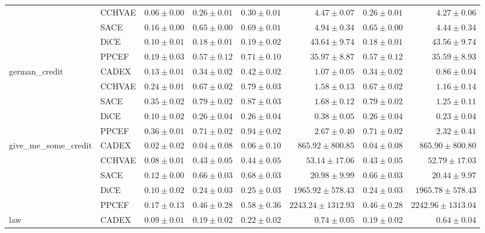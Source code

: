 \begin{table}[ht]
\begin{center}
\begin{sc}
\begin{scriptsize}
\begin{tabular}{l|l|rrrrrr}
 & CCHVAE & $\boldsymbol{0.06\pm{0.00}}$ & $0.26\pm{0.01}$ & $0.30\pm{0.01}$ & $\boldsymbol{4.47\pm{0.07}}$ & $0.26\pm{0.01}$ & $\boldsymbol{4.27\pm{0.06}}$ \\
 & SACE & $0.16\pm{0.00}$ & $0.65\pm{0.00}$ & $0.69\pm{0.01}$ & $4.94\pm{0.34}$ & $0.65\pm{0.00}$ & $4.44\pm{0.34}$ \\
 & DiCE & $0.10\pm{0.01}$ & $0.18\pm{0.01}$ & $\boldsymbol{0.19\pm{0.02}}$ & $43.64\pm{9.74}$ & $0.18\pm{0.01}$ & $43.56\pm{9.74}$ \\
 & PPCEF & $0.19\pm{0.03}$ & $0.57\pm{0.12}$ & $0.71\pm{0.10}$ & $35.97\pm{8.87}$ & $0.57\pm{0.12}$ & $35.59\pm{8.93}$ \\
\midrule
\multirow{5}{*}{german\_credit} & CADEX & $0.13\pm{0.01}$ & $0.34\pm{0.02}$ & $0.42\pm{0.02}$ & $1.07\pm{0.05}$ & $0.34\pm{0.02}$ & $0.86\pm{0.04}$ \\
 & CCHVAE & $0.24\pm{0.01}$ & $0.67\pm{0.02}$ & $0.79\pm{0.03}$ & $1.58\pm{0.13}$ & $0.67\pm{0.02}$ & $1.16\pm{0.14}$ \\
 & SACE & $0.35\pm{0.02}$ & $0.79\pm{0.02}$ & $0.87\pm{0.03}$ & $1.68\pm{0.12}$ & $0.79\pm{0.02}$ & $1.25\pm{0.11}$ \\
 & DiCE & $\boldsymbol{0.10\pm{0.02}}$ & $\boldsymbol{0.26\pm{0.04}}$ & $\boldsymbol{0.26\pm{0.04}}$ & $\boldsymbol{0.38\pm{0.05}}$ & $\boldsymbol{0.26\pm{0.04}}$ & $\boldsymbol{0.23\pm{0.04}}$ \\
 & PPCEF & $0.36\pm{0.01}$ & $0.71\pm{0.02}$ & $0.94\pm{0.02}$ & $2.67\pm{0.40}$ & $0.71\pm{0.02}$ & $2.32\pm{0.41}$ \\
\midrule
\multirow{5}{*}{give\_me\_some\_credit} & CADEX & $\boldsymbol{0.02\pm{0.02}}$ & $\boldsymbol{0.04\pm{0.08}}$ & $\boldsymbol{0.06\pm{0.10}}$ & $865.92\pm{800.85}$ & $\boldsymbol{0.04\pm{0.08}}$ & $865.90\pm{800.80}$ \\
 & CCHVAE & $0.08\pm{0.01}$ & $0.43\pm{0.05}$ & $0.44\pm{0.05}$ & $53.14\pm{17.06}$ & $0.43\pm{0.05}$ & $52.79\pm{17.03}$ \\
 & SACE & $0.12\pm{0.00}$ & $0.66\pm{0.03}$ & $0.68\pm{0.03}$ & $\boldsymbol{20.98\pm{9.99}}$ & $0.66\pm{0.03}$ & $\boldsymbol{20.44\pm{9.97}}$ \\
 & DiCE & $0.10\pm{0.02}$ & $0.24\pm{0.03}$ & $0.25\pm{0.03}$ & $1965.92\pm{578.43}$ & $0.24\pm{0.03}$ & $1965.78\pm{578.43}$ \\
 & PPCEF & $0.17\pm{0.13}$ & $0.46\pm{0.28}$ & $0.58\pm{0.36}$ & $2243.24\pm{1312.93}$ & $0.46\pm{0.28}$ & $2242.96\pm{1313.04}$ \\
\midrule
\multirow{5}{*}{law} & CADEX & $0.09\pm{0.01}$ & $0.19\pm{0.02}$ & $0.22\pm{0.02}$ & $\boldsymbol{0.74\pm{0.05}}$ & $0.19\pm{0.02}$ & $\boldsymbol{0.64\pm{0.04}}$ \\

\end{tabular}
\end{scriptsize}
\end{sc}
\end{center}
\end{table}
